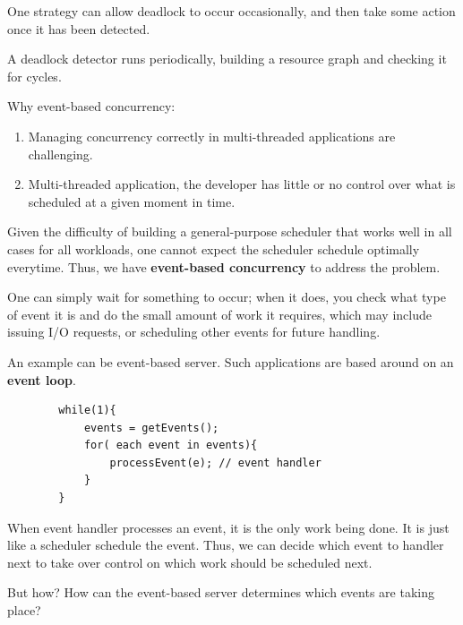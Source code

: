
    One strategy can allow deadlock to occur occasionally, and then take some 
    action once it has been detected.

    A deadlock detector runs periodically,
     building a resource graph and checking it for cycles.


    Why event-based concurrency:

    \begin{enumerate}
        \item Managing concurrency correctly in multi-threaded applications are challenging.
        \item Multi-threaded application, the developer has little or no control over what is scheduled
        at a given moment in time.
    \end{enumerate}

    Given the difficulty of building a general-purpose scheduler that works well in all cases for all workloads,
    one cannot expect the scheduler schedule optimally everytime. Thus, we have \textbf{event-based concurrency}
    to address the problem.


    One can simply wait for something to occur; when it does, you check what type of event it 
    is and do the small amount of work it requires, which may include issuing I/O requests,
    or scheduling other events for future handling.

    An example can be event-based server. Such applications are based around on an \textbf{event loop}.

    \begin{lstlisting}
        while(1){
            events = getEvents();
            for( each event in events){
                processEvent(e); // event handler
            }
        }
    \end{lstlisting}

    When event handler processes an event, it is the only work being done. It is just like a scheduler
    schedule the event. Thus, we can decide which event to handler next to take over control on which 
    work should be scheduled next.

    But how? How can the event-based server determines which events are taking place?


